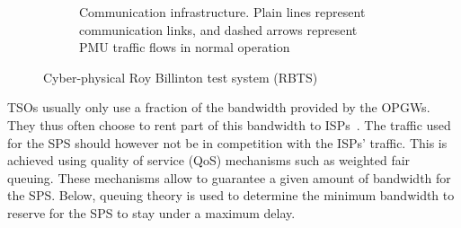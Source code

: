 \begin{figure}
\begin{subfigure}[b]{0.45\textwidth}
         \caption{Communication infrastructure. Plain lines represent communication links, and dashed arrows represent PMU traffic flows in normal operation}
         \label{fig:RBTS-cyber}
     \end{subfigure}
\caption{Cyber-physical Roy Billinton test system (RBTS)}
\label{fig:RBTS}
\end{figure}

TSOs usually only use a fraction of the bandwidth provided by the OPGWs. They thus often choose to rent part of this bandwidth to ISPs~\cite[p110]{bookUK_OPGW}. The traffic used for the SPS should however not be in competition with the ISPs' traffic. This is achieved using quality of service (QoS) mechanisms such as weighted fair queuing. These mechanisms allow to guarantee a given amount of bandwidth for the SPS. Below, queuing theory is used to determine the minimum bandwidth to reserve for the SPS to stay under a maximum delay.

